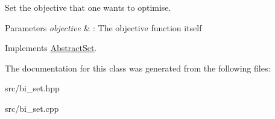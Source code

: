 Set the objective that one wants to optimise. 


\begin{DoxyParams}{Parameters}
{\em objective} & \-: The objective function itself \\
\hline
\end{DoxyParams}


Implements \hyperlink{classAbstractSet_a7aef71679a18ab7965d1098da15b26c2}{Abstract\-Set}.



The documentation for this class was generated from the following files\-:\begin{DoxyCompactItemize}
\item 
src/bi\-\_\-set.\-hpp\item 
src/bi\-\_\-set.\-cpp\end{DoxyCompactItemize}
